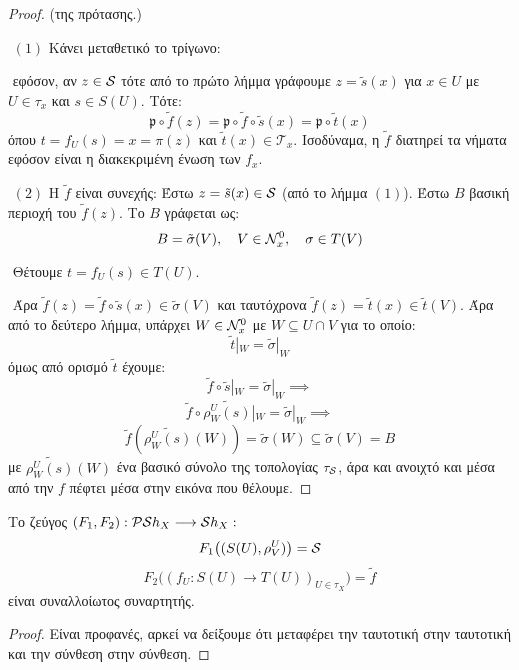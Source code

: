 \begin{proof} (της πρότασης.)

    $ $\newline
    $(1)$ Κάνει μεταθετικό το τρίγωνο:
    
    \begin{figure}[H]
        \centering
    \end{figure}

    $ $\newline
    εφόσον, αν $z \in \mathcal{S}$ τότε από το πρώτο λήμμα γράφουμε $z = \tilde{s}(x)$ για $x \in U$ με $ U \in \tau_x$ και $s \in S(U)$. Τότε: 
    $$\mathfrak{p} \circ \tilde{f}(z) = \mathfrak{p}\circ \tilde{f} \circ \tilde{s}(x) = \mathfrak{p} \circ \tilde{t}(x)$$ όπου $t = f_U(s)=x=\pi(z)$ και $\tilde{t}(x) \in \mathcal{T}_x$. Ισοδύναμα, η $\tilde{f}$ διατηρεί τα νήματα εφόσον είναι η διακεκριμένη ένωση των $f_x$.
    
    $ $\newline
    $(2)$ Η $\tilde{f}$ είναι συνεχής:
    Έστω $z = \tilde{s}(x) \in \mathcal{S}$ (από το λήμμα $(1)$). Έστω $B$ βασική περιοχή του $\tilde{f}(z)$. Το $B$ γράφεται ως:
    $$B = \tilde{\sigma}(V), \quad V\in \mathcal{N}^0_x, \quad \sigma \in T(V)$$

    $ $\newline
    Θέτουμε $ t = f_U(s) \in T(U)$.

    $ $\newline
    Άρα $\tilde{f} (z) =\tilde{f}\circ \tilde{s} (x) \in \tilde{\sigma}(V)$ και ταυτόχρονα $\tilde{f}(z) = \tilde{t}(x) \in \tilde{t}(V)$. Άρα από το δεύτερο λήμμα, υπάρχει $W \in \mathcal{N}^0_x$ με $W\subseteq U\cap V$ για το οποίο:
    $$\tilde{t}|_W = \tilde{\sigma}|_W$$ όμως από ορισμό $\tilde{t}$ έχουμε:
    $$\tilde{f}\circ\tilde{s}|_W = \tilde{\sigma}|_W \implies $$
    $$\tilde{f} \circ \widetilde{\rho^U_W (s)} |_W = \tilde{\sigma}|_W \implies $$
    $$\tilde{f}\left(\widetilde{\rho^U_W(s)}(W)\right) = \tilde{\sigma}(W) \subseteq \tilde{\sigma}(V) = B$$
    με $\widetilde{\rho^U_W(s)}(W)$ ένα βασικό σύνολο της τοπολογίας $\tau_{\mathcal{S}}$, άρα και ανοιχτό και μέσα από την $f$ πέφτει μέσα στην εικόνα που θέλουμε.
\end{proof}

\vspace*{0.3cm}
\begin{theorem} Το ζεύγος $(F_1,F_2): \mathcal{P}\mathcal{S}h_X \longrightarrow \mathcal{S} h_X:$
    $$F_1\big((S(U),\rho^U_V)\big) = \mathcal{S}$$
    $$F_2 \big((f_U:S(U)\rightarrow T(U))_{U \in \tau_X}\big) = \tilde{f}$$ είναι συναλλοίωτος συναρτητής.
\end{theorem}
\begin{proof} Είναι προφανές, αρκεί να δείξουμε ότι μεταφέρει την ταυτοτική στην ταυτοτική και την σύνθεση στην σύνθεση.
\end{proof}

